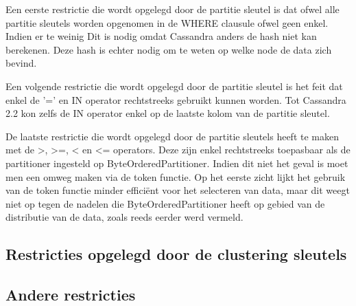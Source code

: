 Een eerste restrictie die wordt opgelegd door de partitie sleutel is dat ofwel alle partitie sleutels worden opgenomen in de WHERE clausule ofwel geen enkel.
Indien er te weinig 
Dit is nodig omdat Cassandra anders de hash niet kan berekenen.
Deze hash is echter nodig om te weten op welke node de data zich bevind.

Een volgende restrictie die wordt opgelegd door de partitie sleutel is het feit dat enkel de '=' en IN operator rechtstreeks gebruikt kunnen worden.
Tot Cassandra 2.2 kon zelfs de IN operator enkel op de laatste kolom van de partitie sleutel.

De laatste restrictie die wordt opgelegd door de partitie sleutels heeft te maken met de >, >=, < en <= operators.
Deze zijn enkel rechtstreeks toepasbaar als de partitioner ingesteld op ByteOrderedPartitioner.
Indien dit niet het geval is moet men een omweg maken via de token functie.
Op het eerste zicht lijkt het gebruik van de token functie minder efficiënt voor het selecteren van data, maar dit weegt niet op tegen de nadelen die ByteOrderedPartitioner heeft op gebied van de distributie van de data, zoals reeds eerder werd vermeld.

\subsection{Restricties opgelegd door de clustering sleutels}

\subsection{Andere restricties}
